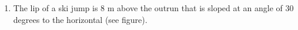 \documentclass[%
]{article}
\newcommand{\vect}[1]{\mathbf{#1}}
\begin{document}
\begin{enumerate}



\item %
The lip of a ski jump is 8 m above the outrun that is sloped at an angle of 30 degrees to the horizontal (see figure).


\end{enumerate}
\end{document}

